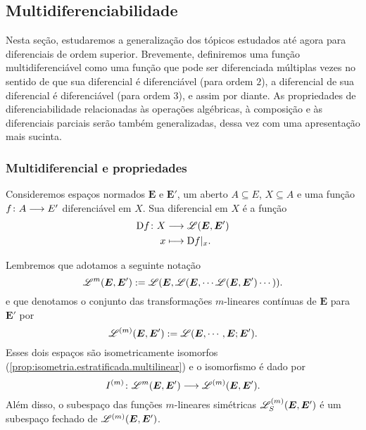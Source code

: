 \subsection{Multidiferenciabilidade}

Nesta seção, estudaremos a generalização dos tópicos estudados até agora para diferenciais de ordem superior. Brevemente, definiremos uma função multidiferenciável como uma função que pode ser diferenciada múltiplas vezes no sentido de que sua diferencial é diferenciável (para ordem $2$), a diferencial de sua diferencial é diferenciável (para ordem $3$), e assim por diante. As propriedades de diferenciabilidade relacionadas às operações algébricas, à composição e às diferenciais parciais serão também generalizadas, dessa vez com uma apresentação mais sucinta.

\subsubsection{Multidiferencial e propriedades}

Consideremos espaços normados $\bm E$ e $\bm E'$, um aberto $A \subseteq E$, $X \subseteq A$ e uma função $f\colon \allowbreak A \longrightarrow E'$ diferenciável em $X$. Sua diferencial em $X$ é a função
	\begin{align*}
	{\mathrm{D}f}\colon {X} &\longrightarrow {\mathscr{L}(\bm E, \bm E')} \\{x} &\longmapsto \mathrm{D} f|_x.
	\end{align*}

Lembremos que adotamos a seguinte notação
	\begin{equation*}
	\mathscr{L}^{m}(\bm E, \bm E') := \mathscr{L}(\bm E, \mathscr{L}(\bm E, \cdots \mathscr{L}(\bm E, \bm E')\cdots)).
	\end{equation*}
e que denotamos o conjunto das transformações $m$-lineares contínuas de $\bm E$ para $\bm E'$ por
	\begin{equation*}
	\mathscr{L}^{(m)}(\bm E, \bm E') := \mathscr{L}(\bm E,\cdots, \bm E; \bm E').
	\end{equation*}
Esses dois espaços são isometricamente isomorfos (\ref{prop:isometria.estratificada.multilinear}) e o isomorfismo é dado por
	\begin{equation*}
	I^{(m)}\colon \allowbreak \mathscr{L}^m(\bm E, \bm E') \longrightarrow \mathscr{L}^{(m)}(\bm E, \bm E').
	\end{equation*}
Além disso, o subespaço das funções $m$-lineares simétricas $\mathscr{L}_{S}^{(m)}(\bm E, \bm E')$ é um subespaço fechado de $\mathscr{L}^{(m)}(\bm E, \bm E')$.

